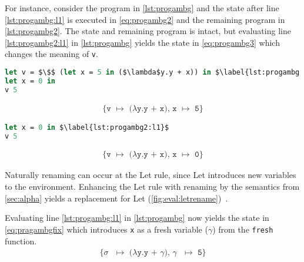 \documentclass[11pt,oneside,a4paper]{report}
\begin{document}
For instance, consider the program in \autoref{lst:progambg} and the state after line \autoref{lst:progambg:l1} is executed in \autoref{eq:progambg2} and the remaining program in \autoref{lst:progambg2}.
The state and remaining program is intact, but evaluating line \autoref{lst:progambg2:l1} in \autoref{lst:progambg} yields the state in \autoref{eq:progambg3} which changes the meaning of \texttt{v}.
\begin{lstlisting}[language=ML,caption={Program which may suffer from variable ambiguity},label={lst:progambg},mathescape=true]
let v = $\$$ (let x = 5 in ($\lambda$y.y + x)) in $\label{lst:progambg:l1}$
let x = 0 in
v 5
\end{lstlisting}
\begin{gather}
  \texttt{\{v $\mapsto$ ($\lambda$y.y + x), x $\mapsto$ 5\}}\label{eq:progambg2}
\end{gather}
\begin{lstlisting}[language=ML,caption={Program after evaluating \texttt{v}},label={lst:progambg2},mathescape=true]
let x = 0 in $\label{lst:progambg2:l1}$
v 5
\end{lstlisting}
\begin{gather}
  \texttt{\{v $\mapsto$ ($\lambda$y.y + x), x $\mapsto$ 0\}}\label{eq:progambg3}
\end{gather}

Naturally renaming can occur at the Let rule, since Let introduces new variables to the environment.
Enhancing the Let rule with renaming by the semantics from \autoref{sec:alpha} yields a replacement for Let (\autoref{fig:eval:letrename})~\cite{sestoft1997deriving}. 
\begin{figure}[ht]
  \begin{mdframed}
    \begin{prooftree}
    \end{prooftree}   
  \end{mdframed}
  \caption{}
  \label{fig:eval:letrename}
\end{figure}
Evaluating line \autoref{lst:progambg:l1} in \autoref{lst:progambg} now yields the state in \autoref{eq:pragambgfix} which introduces \texttt{x} as a fresh variable ($\gamma$) from the \texttt{fresh} function.
\begin{gather}
  \texttt{\{$\sigma$ $\mapsto$ ($\lambda$y.y + $\gamma$), $\gamma$ $\mapsto$ 5\}}\label{eq:pragambgfix}
\end{gather}
\end{document}

